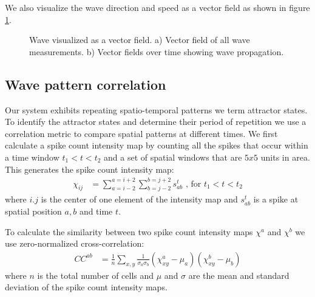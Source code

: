 \documentclass[12pt]{article}
\begin{document}
We also visualize the wave direction and speed as a vector field as shown in figure \ref{fig:WavePropQuiver}.
\begin{figure}[!htb]
 \caption{Wave visualized as a vector field.
          a) Vector field of all wave measurements.
          b) Vector fields over time showing wave propagation.
          } 
 \label{fig:WavePropQuiver}
\end{figure}
\FloatBarrier

\subsection{Wave pattern correlation}
Our system exhibits repeating spatio-temporal patterns we term attractor states.
To identify the attractor states and determine their period of repetition we use a correlation metric
to compare spatial patterns at different times.
We first calculate a spike count intensity map by counting all the spikes that occur within a 
time window $t_1<t<t_2$ and a set of spatial windows that are $5x5$ units in area. 
This generates the spike count intensity map:
\begin{align}
 \chi_{ij} &= \sum_{a=i-2}^{a=i+2} \sum_{b=j-2}^{b=j+2}s_{ab}^t\text{\ , for } t_1<t<t_2 
\end{align}
where $i.j$ is the center of one element of the intensity map and $s_{ab}^t$ is a spike at spatial position $a,b$ and time $t$.

To calculate the similarity between two spike count intensity maps $\chi^a$ and $\chi^b$ we use zero-normalized cross-correlation:
\begin{align}
 CC^{ab} &= \frac{1}{n}\sum_{x,y} \frac{1}{\sigma_a\sigma_b}\left(\chi_{xy}^a-\mu_a\right)\left(\chi_{xy}^b-\mu_b \right)
\end{align}
where $n$ is the total number of cells and $\mu$ and $\sigma$ are the mean and standard deviation of the spike count intensity maps.
\end{document}

